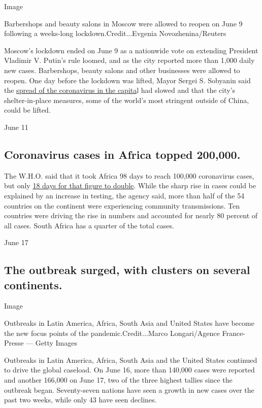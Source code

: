 Image

Barbershops and beauty salons in Moscow were allowed to reopen on June 9
following a weeks-long lockdown.Credit...Evgenia Novozhenina/Reuters

Moscow's lockdown ended on June 9 as a nationwide vote on extending
President Vladimir V. Putin's rule loomed, and as the city reported more
than 1,000 daily new cases. Barbershops, beauty salons and other
businesses were allowed to reopen. One day before the lockdown was
lifted, Mayor Sergei S. Sobyanin said the
\href{https://www.nytimes3xbfgragh.onion/2020/05/11/world/europe/coronavirus-deaths-moscow.html}{spread
of the coronavirus in the capita}l had slowed and that the city's
shelter-in-place measures, some of the world's most stringent outside of
China, could be lifted.

June 11

\hypertarget{coronavirus-cases-in-africa-topped-200000}{%
\subsection{Coronavirus cases in Africa topped
200,000.}\label{coronavirus-cases-in-africa-topped-200000}}

The W.H.O. said that it took Africa 98 days to reach 100,000 coronavirus
cases, but only \href{https://news.un.org/en/story/2020/06/1066142}{18
days for that figure to double}. While the sharp rise in cases could be
explained by an increase in testing, the agency said, more than half of
the 54 countries on the continent were experiencing community
transmissions. Ten countries were driving the rise in numbers and
accounted for nearly 80 percent of all cases. South Africa has a quarter
of the total cases.

June 17

\hypertarget{the-outbreak-surged-with-clusters-on-several-continents}{%
\subsection{The outbreak surged, with clusters on several
continents.}\label{the-outbreak-surged-with-clusters-on-several-continents}}

Image

Outbreaks in Latin America, Africa, South Asia and United States have
become the new focus points of the pandemic.Credit...Marco
Longari/Agence France-Presse --- Getty Images

Outbreaks in Latin America, Africa, South Asia and the United States
continued to drive the global caseload. On June 16, more than 140,000
cases were reported and another 166,000 on June 17, two of the three
highest tallies since the outbreak began. Seventy-seven nations have
seen a growth in new cases over the past two weeks, while only 43 have
seen declines.

